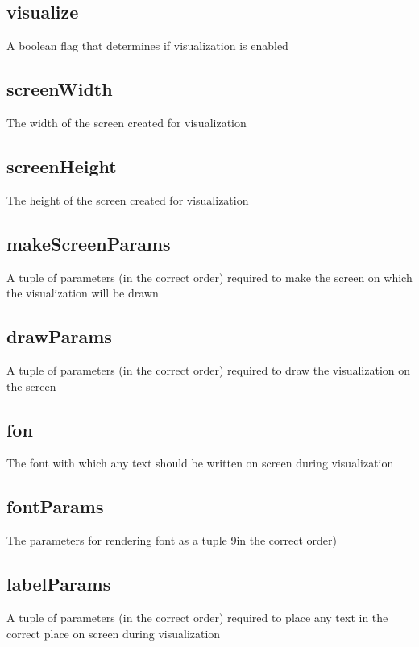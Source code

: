 \documentclass[letterpaper,10pt,english]{sphinxmanual}
\begin{document}
\subsection{visualize}
\label{settings.py:visualize}
A boolean flag that determines if visualization is enabled


\subsection{screenWidth}
\label{settings.py:screenwidth}
The width of the screen created for visualization


\subsection{screenHeight}
\label{settings.py:screenheight}
The height of the screen created for visualization


\subsection{makeScreenParams}
\label{settings.py:makescreenparams}
A tuple of parameters (in the correct order) required to make the screen on which the visualization will be drawn


\subsection{drawParams}
\label{settings.py:drawparams}
A tuple of parameters (in the correct order) required to draw the visualization on the screen


\subsection{fon}
\label{settings.py:fon}
The font with which any text should be written on screen during visualization


\subsection{fontParams}
\label{settings.py:fontparams}
The parameters for rendering font as a tuple 9in the correct order)


\subsection{labelParams}
\label{settings.py:labelparams}
A tuple of parameters (in the correct order) required to place any text in the correct place on screen during visualization
\end{document}
